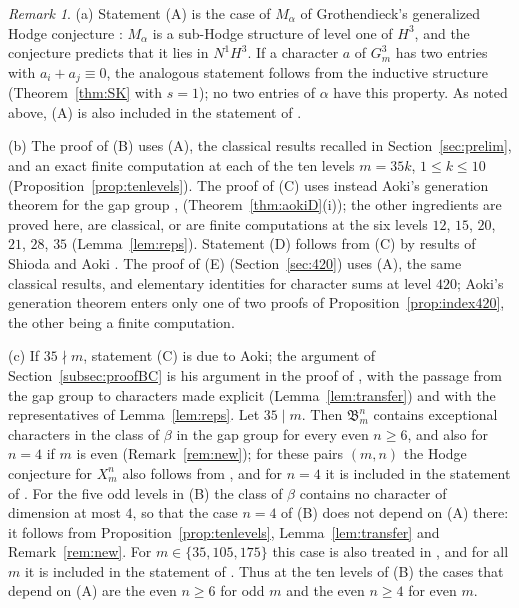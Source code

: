 \documentclass[11pt]{amsart}
\theoremstyle{definition}
\theoremstyle{remark}
\newtheorem{remark}[theorem]{Remark}
\numberwithin{equation}{section}
\newcommand{\fB}{\mathfrak{B}}
\begin{document}
\begin{remark}\label{rem:intro}
(a) Statement (A) is the case of $M_\alpha$ of Grothendieck's generalized Hodge conjecture \cite{Gro69}: $M_\alpha$ is a sub-Hodge structure of level one of $H^3$, and the conjecture predicts that it lies in $N^1H^3$. If a character $a$ of $G^3_m$ has two entries with $a_i+a_j\equiv 0$, the analogous statement follows from the inductive structure (Theorem~\ref{thm:SK} with $s=1$); no two entries of $\alpha$ have this property. As noted above, (A) is also included in the statement of \cite[Cor.~3.2]{Ka16}.

(b) The proof of (B) uses (A), the classical results recalled in Section~\ref{sec:prelim}, and an exact finite computation at each of the ten levels $m=35k$, $1\le k\le 10$ (Proposition~\ref{prop:tenlevels}). The proof of (C) uses instead Aoki's generation theorem for the gap group \cite[Thm.~2.1]{Ao00}, \cite[Thm.~D]{Ao83} (Theorem~\ref{thm:aokiD}(i)); the other ingredients are proved here, are classical, or are finite computations at the six levels $12$, $15$, $20$, $21$, $28$, $35$ (Lemma~\ref{lem:reps}). Statement (D) follows from (C) by results of Shioda \cite[Thm.~IV]{Sh79} and Aoki \cite[Cor.~3.2]{Ao00}. The proof of (E) (Section~\ref{sec:420}) uses (A), the same classical results, and elementary identities for character sums at level $420$; Aoki's generation theorem enters only one of two proofs of Proposition~\ref{prop:index420}, the other being a finite computation.

(c) If $35\nmid m$, statement (C) is due to Aoki; the argument of Section~\ref{subsec:proofBC} is his argument in the proof of \cite[Thm.~0.1]{Ao00}, with the passage from the gap group to characters made explicit (Lemma~\ref{lem:transfer}) and with the representatives of Lemma~\ref{lem:reps}. Let $35\mid m$. Then $\fB^n_m$ contains exceptional characters in the class of $\beta$ in the gap group for every even $n\ge6$, and also for $n=4$ if $m$ is even (Remark~\ref{rem:new}); for these pairs $(m,n)$ the Hodge conjecture for $X^n_m$ also follows from \cite[Thm.~1.1, Cor.~4.2]{MMMV26}, and for $n=4$ it is included in the statement of \cite[Cor.~3.2]{Ka16}. For the five odd levels in (B) the class of $\beta$ contains no character of dimension at most $4$, so that the case $n=4$ of (B) does not depend on (A) there: it follows from Proposition~\ref{prop:tenlevels}, Lemma~\ref{lem:transfer} and Remark~\ref{rem:new}. For $m\in\{35,105,175\}$ this case is also treated in \cite{dS21,Jum26a}, and for all $m$ it is included in the statement of \cite[Cor.~3.2]{Ka16}. Thus at the ten levels of (B) the cases that depend on (A) are the even $n\ge6$ for odd $m$ and the even $n\ge4$ for even $m$.


\end{remark}
\end{document}
